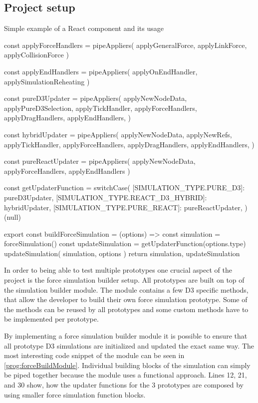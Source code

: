 \subsection{Project setup}

\begin{program}
\caption{Simple example of a React component and its usage} 
\label{prog:forceBuildModule}
\begin{JsCode}
const applyForceHandlers = pipeAppliers(
  applyGeneralForce, 
  applyLinkForce, 
  applyCollisionForce
)

const applyEndHandlers = pipeAppliers(
  applyOnEndHandler, 
  applySimulationReheating
)

const pureD3Updater = pipeAppliers(
  applyNewNodeData,
  applyPureD3Selection,
  applyTickHandler,
  applyForceHandlers,
  applyDragHandlers,
  applyEndHandlers,
)

const hybridUpdater = pipeAppliers(
  applyNewNodeData,
  applyNewRefs,
  applyTickHandler,
  applyForceHandlers,
  applyDragHandlers,
  applyEndHandlers,
)

const pureReactUpdater = pipeAppliers(
  applyNewNodeData, 
  applyForceHandlers, 
  applyEndHandlers
)

const getUpdaterFunction = switchCase({
  [SIMULATION_TYPE.PURE_D3]: pureD3Updater,
  [SIMULATION_TYPE.REACT_D3_HYBRID]: hybridUpdater,
  [SIMULATION_TYPE.PURE_REACT]: pureReactUpdater,
})(null)

export const buildForceSimulation = (options) => {
  const simulation = forceSimulation()
  const updateSimulation = getUpdaterFunction(options.type)
  updateSimulation({ simulation, options })
  return { simulation, updateSimulation }
}
\end{JsCode}
\end{program}

In order to being able to test multiple prototypes one crucial aspect of the project is the force simulation builder setup. All prototypes are built on top of the simulation builder module. The module contains a few D3 specific methods, that allow the developer to build their own force simulation prototype. Some of the methods can be reused by all prototypes and some custom methods have to be implemented per prototype.

By implementing a force simulation builder module it is possible to ensure that all prototype D3 simulations are initialized and updated the exact same way. The most interesting code snippet of the module can be seen in \ref{prog:forceBuildModule}. Individual building blocks of the simulation can simply be piped together because the module uses a functional approach. Lines 12, 21, and 30 show, how the updater functions for the 3 prototypes are composed by using smaller force simulation function blocks.

